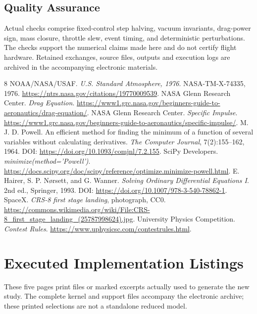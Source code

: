 \documentclass[11pt,a4paper]{article}
\begin{document}
\subsection{Quality Assurance}
Actual checks comprise fixed-control step halving, vacuum invariants, drag-power sign, mass closure, throttle slew, event timing, and deterministic perturbations. The checks support the numerical claims made here and do not certify flight hardware. Retained exchanges, source files, outputs and execution logs are archived in the accompanying electronic materials.

\clearpage{}
\begin{thebibliography}{8}\small
{} NOAA/NASA/USAF. \emph{U.S. Standard Atmosphere, 1976}. NASA-TM-X-74335, 1976. \url{https://ntrs.nasa.gov/citations/19770009539}.
 NASA Glenn Research Center. \emph{Drag Equation}. \url{https://www1.grc.nasa.gov/beginners-guide-to-aeronautics/drag-equation/}.
 NASA Glenn Research Center. \emph{Specific Impulse}. \url{https://www1.grc.nasa.gov/beginners-guide-to-aeronautics/specific-impulse/}.
 M. J. D. Powell. An efficient method for finding the minimum of a function of several variables without calculating derivatives. \emph{The Computer Journal}, 7(2):155--162, 1964. DOI: \url{https://doi.org/10.1093/comjnl/7.2.155}.
 SciPy Developers. \emph{minimize(method='Powell')}. \url{https://docs.scipy.org/doc/scipy/reference/optimize.minimize-powell.html}.
 E. Hairer, S. P. N\o rsett, and G. Wanner. \emph{Solving Ordinary Differential Equations I}. 2nd ed., Springer, 1993. DOI: \url{https://doi.org/10.1007/978-3-540-78862-1}.
 SpaceX. \emph{CRS-8 first stage landing}, photograph, CC0. \url{https://commons.wikimedia.org/wiki/File:CRS-8_first_stage_landing_(25787998624).jpg}.
 University Physics Competition. \emph{Contest Rules}. \url{https://www.uphysicsc.com/contestrules.html}.
\end{thebibliography}
\clearpage\appendix\section{Executed Implementation Listings}\label{app:code}
\noindent These five pages print files or marked excerpts actually used to generate the new study. The complete kernel and support files accompany the electronic archive; these printed selections are not a standalone reduced model.
\end{document}
